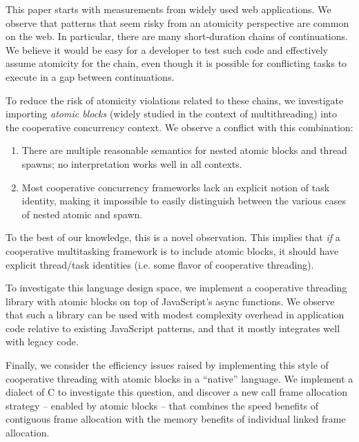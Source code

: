 \documentclass[acmsmall,anonymous,review]{acmart}\settopmatter{printfolios=true,printccs=false,printacmref=false}
\begin{document}

This paper starts with measurements from widely used web applications\footnotemark{}.
We observe that patterns that seem risky from an atomicity perspective are common on the web.
In particular, there are many short-duration chains of continuations.
We believe it would be easy for a developer to test such code and effectively assume atomicity for the chain, even though it is possible for conflicting tasks to execute in a gap between continuations.


To reduce the risk of atomicity violations related to these chains, we investigate importing \emph{atomic blocks} (widely studied in the context of multithreading) into the cooperative concurrency context.
We observe a conflict with this combination:
\begin{enumerate}
\item There are multiple reasonable semantics for nested atomic blocks and thread spawns; no interpretation works well in all contexts.
\item Most cooperative concurrency frameworks lack an explicit notion of task identity, making it impossible to easily distinguish between the various cases of nested atomic and spawn.
\end{enumerate}
To the best of our knowledge, this is a novel observation.
This implies that \emph{if} a cooperative multitasking framework is to include atomic blocks, it should have explicit thread/task identities (i.e. some flavor of cooperative threading).

To investigate this language design space, we implement a cooperative threading library with atomic blocks on top of JavaScript's async functions.
We observe that such a library can be used with modest complexity overhead in application code relative to existing JavaScript patterns, and that it mostly integrates well with legacy code.

Finally, we consider the efficiency issues raised by implementing this style of cooperative threading with atomic blocks in a ``native'' language.
We implement a dialect of C to investigate this question, and discover a new call frame allocation strategy -- enabled by atomic blocks -- that combines the speed benefits of contiguous frame allocation with the memory benefits of individual linked frame allocation.
\end{document}
